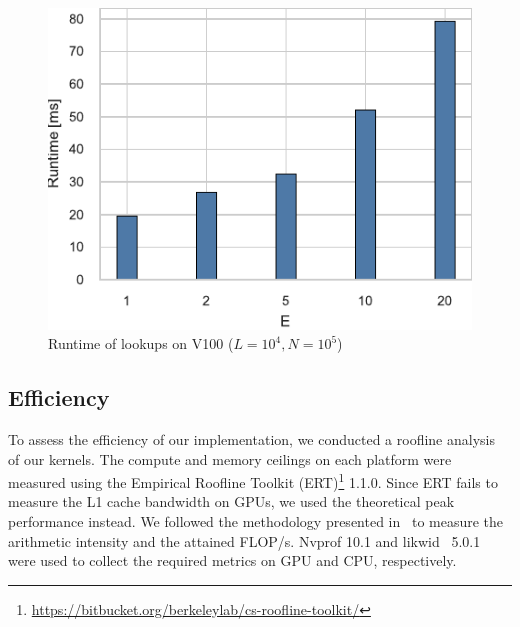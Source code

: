 \documentclass[conference]{IEEEtran}
\begin{document}
\begin{figure}
    \centering
    \includegraphics{figs/runtime_lookup_v100}
    \caption{Runtime of lookups on V100 ($L=10^4, N=10^5$)}%
    \label{fig:breakdown-lookup-v100}
\end{figure}

\subsection{Efficiency}

To assess the efficiency of our implementation, we conducted a roofline
analysis~\cite{Williams2008} of our kernels. The compute and memory ceilings
on each platform were measured using the Empirical Roofline Toolkit (ERT)\footnote{\url{https://bitbucket.org/berkeleylab/cs-roofline-toolkit/}} 1.1.0.
Since ERT fails to measure the L1 cache bandwidth on GPUs, we used the
theoretical peak performance instead. We followed the methodology presented
in~\cite{Yang2020a,Yang2020b} to measure the arithmetic intensity and the
attained FLOP/s. Nvprof 10.1 and likwid~\cite{Treibig2010} 5.0.1 were used to
collect the required metrics on GPU and CPU, respectively.

\end{document}
